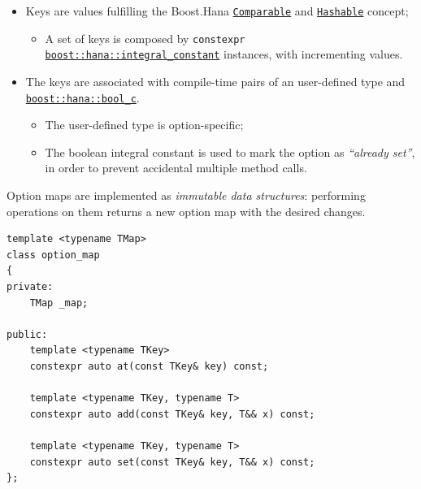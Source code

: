 \documentclass[twoside, 12pt, a4paper, openany]{book}
\providecommand{\tightlist}{%
  \setlength{\itemsep}{0pt}\setlength{\parskip}{0pt}}
\begin{document}
\begin{itemize}
\item
  Keys are values fulfilling the Boost.Hana
  \href{http://www.boost.org/doc/libs/1_61_0/libs/hana/doc/html/group__group-Comparable.html}{\texttt{Comparable}}
  and
  \href{http://www.boost.org/doc/libs/1_61_0/libs/hana/doc/html/group__group-Hashable.html}{\texttt{Hashable}}
  concept;

  \begin{itemize}
  \tightlist
  \item
    A set of keys is composed by
    \texttt{constexpr}
    \href{http://www.boost.org/doc/libs/1_61_0/libs/hana/doc/html/structboost_1_1hana_1_1integral__constant.html}{\texttt{boost::hana::integral_constant}}
    instances, with incrementing values.
  \end{itemize}
\item
  The keys are associated with compile-time pairs of an user-defined
  type and
  \href{http://www.boost.org/doc/libs/1_61_0/libs/hana/doc/html/structboost_1_1hana_1_1integral__constant.html\#aa301b96de91d665fdc846bde4659b0d3}{\texttt{boost::hana::bool_c}}.

  \begin{itemize}
  \item
    The user-defined type is option-specific;
  \item
    The boolean integral constant is used to mark the option as
    \emph{``already set''}, in order to prevent accidental multiple
    method calls.
  \end{itemize}
\end{itemize}

Option maps are implemented as \emph{immutable data structures}:
performing operations on them returns a new option map with the desired
changes.

\begin{verbatim}
template <typename TMap>
class option_map
{
private:
    TMap _map;

public:
    template <typename TKey>
    constexpr auto at(const TKey& key) const;

    template <typename TKey, typename T>
    constexpr auto add(const TKey& key, T&& x) const;

    template <typename TKey, typename T>
    constexpr auto set(const TKey& key, T&& x) const;
};
\end{verbatim}
\end{document}
